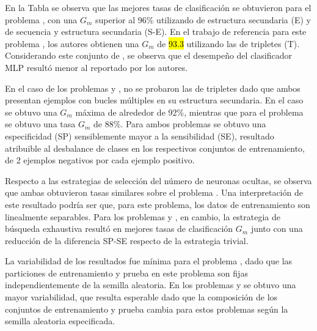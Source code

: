 
En la Tabla se observa que las mejores tasas de clasificación se
obtuvieron para el problema \tripletsvm{}, con una $G_m$ superior al
96\% utilizando  de estructura secundaria (E) y de secuencia
y estructura secundaria (S-E).
En el trabajo de referencia para este problema \cite{xue}, los autores
obtienen una $G_m$ de \hl{93.3} utilizando las  de tripletes
(T).
Considerando este conjunto de , se observa que el desempeño
del clasificador MLP resultó menor al reportado por los autores.

En el caso de los problemas \mipred{} y \micropred{}, no se probaron
las  de tripletes dado que ambos presentan ejemplos con bucles
múltiples en su estructura secundaria. 
En el caso \mipred{} se obtuvo una $G_m$ máxima de alrededor de 92\%,
mientras que para el problema \micropred{} se obtuvo una tasa $G_m$ de
88\%.
Para ambos problemas se obtuvo una especificidad (SP) sensiblemente
mayor a la sensibilidad (SE), resultado atribuible al desbalance de
clases en los respectivos conjuntos de entrenamiento, de 2 ejemplos
negativos por cada ejemplo positivo.


Respecto a las estrategias de selección del número de neuronas
ocultas, se observa que ambas obtuvieron tasas similares sobre el
problema \tripletsvm{}.
Una interpretación de este resultado podría ser que, para este
problema, los datos de entrenamiento son linealmente separables.
Para los problemas \mipred{} y \micropred{}, en cambio, la estrategia
de búsqueda exhaustiva resultó en mejores tasas de clasificación $G_m$
junto con una reducción de la diferencia SP-SE respecto de la
estrategia trivial.

La variabilidad de los resultados fue mínima para el problema
\tripletsvm{}, dado que las particiones de entrenamiento y prueba
en este problema son fijas independientemente de la semilla aleatoria.
En los problemas \mipred{} y \micropred{} se obtuvo una mayor
variabilidad, que resulta esperable dado que la composición de los
conjuntos de entrenamiento y prueba cambia para estos problemas según
la semilla aleatoria especificada.

